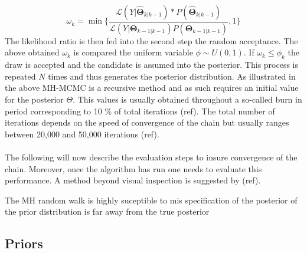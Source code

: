 \documentclass[12pt,a4paper,english]{article} %
\newcommand{\matr}[1]{\mathbf{#1}} %
\newcommand{\Lagr}{\mathcal{L}} %
\begin{document}
	\[
	\omega_k = \min \{
						\frac{ \Lagr(Y| \matr{\hat{\Theta}}_{k|k-1}) * P(\matr{\hat{\Theta}}_{k|k-1}) } 
						{ \Lagr(Y| \matr{\Theta}_{k-1|k-1}) P(\matr{\Theta}_{k-1|k-1})},
						 1
					\}
	\]
	The likelihood ratio is then fed into the second step the random acceptance. The above obtained $\omega_k$ is compared the uniform variable $\phi \sim U(0, 1)$. If $\omega_k \leq \phi_k$ the draw is accepted and the candidate is assumed into the posterior. This process is repeated $N$ times and thus generates the posterior distribution.
	As illustrated in the above MH-MCMC is a recursive method and as such requires an initial value for the posterior $\Theta$. This values is usually obtained throughout a so-called burn in period corresponding to 10 \% of total iterations (ref). The total number of iterations depends on the speed of convergence of the chain but usually ranges between 20,000 and 50,000 iterations (ref).\\
	\\
	The following will now describe the evaluation steps to insure convergence of the chain. Moreover, once the algorithm has run one needs to evaluate this performance. A method beyond visual inspection is suggested by (ref).
	
	The MH random walk is highly suceptible to mis specification of the posterior of the prior distribution is far away from the true posterior \cite{herbst_bayesian_2016}
			
	\subsection{Priors}
	
\end{document}
